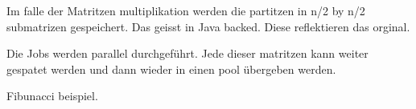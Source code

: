 Im falle der Matritzen multiplikation werden die partitzen in n/2 by n/2 submatrizen gespeichert. Das geisst in Java backed. Diese reflektieren das orginal. 

Die Jobs werden parallel durchgeführt. Jede dieser matritzen kann weiter gespatet werden und dann wieder in einen pool übergeben werden. 


Fibunacci beispiel.


